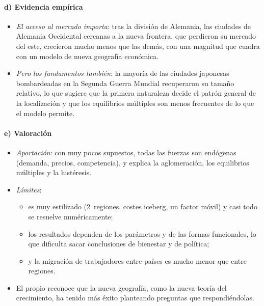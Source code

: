 \documentclass[11pt]{article}
\begin{document}
\paragraph{d) Evidencia empírica}

\begin{itemize}
\item \emph{El acceso al mercado importa}: tras la división de Alemania, las ciudades de Alemania Occidental cercanas a la nueva frontera, que perdieron su mercado del este, crecieron mucho menos que las demás, con una magnitud que cuadra con un modelo de nueva geografía económica\nocite{ReddingSturm2008Costs}.
\item \emph{Pero los fundamentos también}: la mayoría de las ciudades japonesas bombardeadas en la Segunda Guerra Mundial recuperaron su tamaño relativo, lo que sugiere que la primera naturaleza decide el patrón general de la localización y que los equilibrios múltiples son menos frecuentes de lo que el modelo permite\nocite{DavisWeinstein2002Bones}.
\end{itemize}

\paragraph{e) Valoración}

\begin{itemize}
\item \emph{Aportación}: con muy pocos supuestos, todas las fuerzas son endógenas (demanda, precios, competencia), y explica la aglomeración, los equilibrios múltiples y la histéresis.
\item \emph{Límites}\nocite{Neary2001Hype}:
  \begin{itemize}
  \item es muy estilizado (2~regiones, costes iceberg, un factor móvil) y casi todo se resuelve numéricamente;
  \item los resultados dependen de los parámetros y de las formas funcionales, lo que dificulta sacar conclusiones de bienestar y de política;
  \item y la migración de trabajadores entre países es mucho menor que entre regiones.
  \end{itemize}
\item El propio \textcite{Krugman1998What} reconoce que la nueva geografía, como la nueva teoría del crecimiento, ha tenido más éxito planteando preguntas que respondiéndolas.
\end{itemize}
\end{document}

